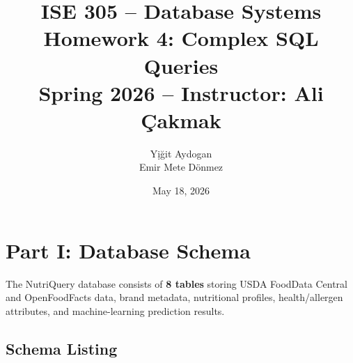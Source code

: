 \documentclass[12pt,a4paper]{article}
\title{\textbf{ISE 305 -- Database Systems}\\Homework 4: Complex SQL Queries\\[6pt]\large Spring 2026 -- Instructor: Ali \c{C}akmak}
\author{Y\d{i}\u{g}it Aydogan \quad 150230208\\Emir Mete D\"{o}nmez \quad 150220205}
\date{May 18, 2026}
\begin{document}
\maketitle

\section{Part I: Database Schema}

The NutriQuery database consists of \textbf{8 tables} storing USDA FoodData Central and
OpenFoodFacts data, brand metadata, nutritional profiles, health/allergen attributes, and
machine-learning prediction results.

\subsection{Schema Listing}
\end{document}
